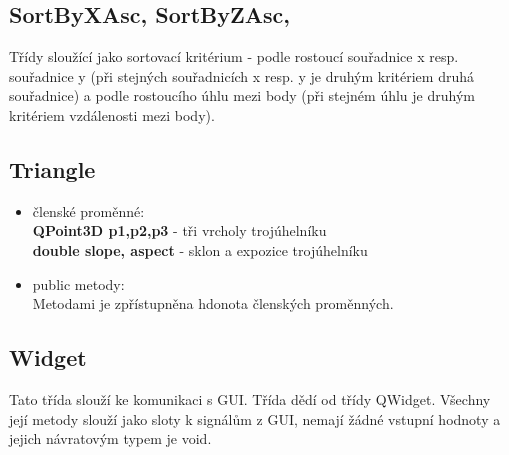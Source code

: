 \documentclass[a4paper, 12pt]{article}
\begin{document}
\subsection{SortByXAsc, SortByZAsc,}
Třídy sloužící jako sortovací kritérium - podle rostoucí souřadnice x resp. souřadnice y (při stejných souřadnicích x resp. y je druhým kritériem druhá souřadnice) a podle rostoucího úhlu mezi body (při stejném úhlu je druhým kritériem vzdálenosti mezi body).

%
\subsection{Triangle}
\begin{itemize}
	\item členské proměnné:\\ \textbf{QPoint3D p1,p2,p3} - tři vrcholy trojúhelníku \\
	\textbf{double slope, aspect} - sklon a expozice trojúhelníku
	\item public metody:\\
	Metodami je zpřístupněna hdonota členských proměnných.
\end{itemize}


\clearpage


\subsection{Widget}
Tato třída slouží ke komunikaci s GUI. Třída dědí od třídy QWidget. Všechny její metody slouží jako sloty k signálům z GUI, nemají žádné vstupní hodnoty a jejich návratovým typem je void. 
\end{document}
